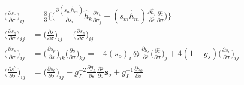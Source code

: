 \documentclass[12pt]{amsart}
\begin{document}
\begin{equation}
  \label{eq:dsp_dsig}
  \begin{split}
    \bigg(\frac{\partial s_c}{\partial \sigma}\bigg)_{ij}&=\frac{8}{3}\Bigg\{\bigg( \frac{\partial (s_m\hat{h}_m)}{\partial s_i}\hat{h}_k\frac{\partial s_k}{\partial\sigma_j} +(s_m\hat{h}_m) \frac{\partial \hat{h}_i}{\partial \bar{\varepsilon}}\frac{\partial\bar{\varepsilon}}{\partial\sigma} \bigg)  \Bigg\}\\
    \bigg(\frac{\partial s_o}{\partial \sigma}\bigg)_{ij}&=\bigg(\frac{\partial s}{\partial\sigma}\bigg)_{ij}-\bigg(\frac{\partial s_c}{\partial \sigma}\bigg)_{ij}\\
    \bigg(\frac{\partial s_p}{\partial \sigma}\bigg)_{ij}&=\bigg(\frac{\partial s_p}{\partial s}\bigg)_{ik} \bigg(\frac{\partial s}{\partial \sigma}\bigg)_{kj}= -4(s_o)_i\otimes\frac{\partial g_s}{\partial \bar{\varepsilon}}\bigg(\frac{\partial\bar{\varepsilon}}{\partial\sigma}\bigg)_j + 4(1-g_s) \bigg(\frac{\partial s_o}{\partial \sigma}\bigg)_{ij}\\
    \bigg(\frac{\partial s^{\prime\prime}}{\partial\sigma}\bigg)_{ij}&=\bigg(\frac{\partial s_c}{\partial\sigma}\bigg)_{ij}-g_L^{-2}\frac{\partial g_L}{\partial\bar{\varepsilon}}\frac{\partial\bar{\varepsilon}}{\partial \sigma}\mathbf{s}_o+g_L^{-1}\frac{\partial s_o}{\partial\sigma}
  \end{split}
\end{equation}
\newpage
\end{document}
